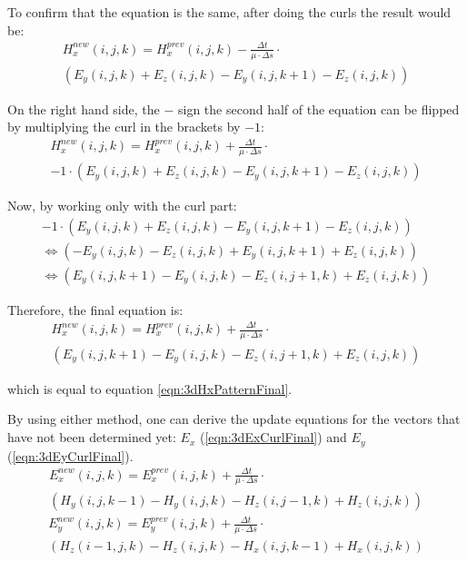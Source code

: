 To confirm that the equation is the same, after doing the curls the result would be:
\begin{multline}
	\label{eqn:3dHxCurl1}
	H_x^{new}(i,j,k) =  H_x^{prev}(i,j,k) - \frac{\Delta t}{\mu \cdot \Delta s} \cdot \\ (E_y(i,j,k) + E_z(i,j,k) - E_y(i,j,k+1) - E_z(i,j,k))
\end{multline}

On the right hand side, the $-$ sign the second half of the equation can be flipped by multiplying the curl in the brackets by $-1$:
\begin{multline}
	\label{eqn:3dHxCurl2}
	H_x^{new}(i,j,k) =  H_x^{prev}(i,j,k) + \frac{\Delta t}{\mu \cdot \Delta s} \cdot \\ -1 \cdot (E_y(i,j,k) + E_z(i,j,k) - E_y(i,j,k+1) - E_z(i,j,k))
\end{multline}

Now, by working only with the curl part:
\begin{multline}
	-1 \cdot (E_y(i,j,k) + E_z(i,j,k) - E_y(i,j,k+1) - E_z(i,j,k)) \\
	\Leftrightarrow (- E_y(i,j,k) - E_z(i,j,k) + E_y(i,j,k+1) + E_z(i,j,k)) \\
	\Leftrightarrow (E_y(i,j,k+1) - E_y(i,j,k) - E_z(i,j+1,k) + E_z(i,j,k))
\end{multline}

Therefore, the final equation is:
\begin{multline}
	\label{eqn:3dHxCurlFinal}
	H_x^{new}(i,j,k) =  H_x^{prev}(i,j,k) + \frac{\Delta t}{\mu \cdot \Delta s} \cdot \\ (E_y(i,j,k+1) - E_y(i,j,k) - E_z(i,j+1,k) + E_z(i,j,k))
\end{multline}

which is equal to equation \ref{eqn:3dHxPatternFinal}.

By using either method, one can derive the update equations for the vectors that have not been determined yet: $E_x$ (\ref{eqn:3dExCurlFinal}) and $E_y$ (\ref{eqn:3dEyCurlFinal}).
\begin{multline}
	\label{eqn:3dExCurlFinal}
	E_x^{new}(i,j,k) =  E_x^{prev}(i,j,k) + \frac{\Delta t}{\mu \cdot \Delta s} \cdot \\ (H_y(i,j,k-1) - H_y(i,j,k) - H_z(i,j-1,k) + H_z(i,j,k))
\end{multline}
\begin{multline}
	\label{eqn:3dEyCurlFinal}
	E_y^{new}(i,j,k) =  E_y^{prev}(i,j,k) + \frac{\Delta t}{\mu \cdot \Delta s} \cdot \\ (H_z(i-1,j,k) - H_z(i,j,k) - H_x(i,j,k-1) + H_x(i,j,k))
\end{multline}

